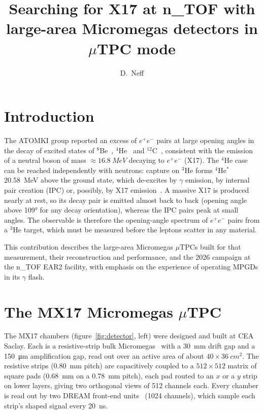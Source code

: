\documentclass[a4paper,11pt]{article}
\title{\boldmath Searching for X17 at n\_TOF with large-area Micromegas detectors in $\mu$TPC mode}
\author[a,1]{D.~Neff\note{Corresponding author.}}
\affiliation[a]{AFFILIATION,\\ADDRESS, COUNTRY} %
\begin{document}
\maketitle
\flushbottom

\section{Introduction}
\label{sec:intro}

The ATOMKI group reported an excess of $e^+e^-$ pairs at large opening angles in the decay of
excited states of $^8$Be~\cite{Krasznahorkay2016}, $^4$He~\cite{Krasznahorkay2021} and
$^{12}$C~\cite{Krasznahorkay2022}, consistent with the emission of a neutral boson of mass
$\approx\SI{16.8}{MeV}$ decaying to $e^+e^-$ (X17). The $^4$He case can be reached independently with
neutrons: capture on $^3$He forms $^4$He$^*$ \SI{20.58}{MeV} above the ground state, which
de-excites by $\gamma$ emission, by internal pair creation (IPC) or, possibly, by X17
emission~\cite{Viviani2022}. A massive X17 is produced nearly at rest, so its decay pair is emitted
almost back to back (opening angle above \ang{109} for any decay orientation), whereas the IPC
pairs peak at small angles. The observable is therefore the opening-angle spectrum of $e^+e^-$
pairs from a $^3$He target, which must be measured before the leptons scatter in any material.

This contribution describes the large-area Micromegas $\mu$TPCs built for that measurement, their
reconstruction and performance, and the 2026 campaign at the n\_TOF EAR2 facility, with emphasis on
the experience of operating MPGDs in its $\gamma$ flash.

\section{The MX17 Micromegas $\mu$TPC}
\label{sec:detector}

The MX17 chambers (figure~\ref{fig:detector}, left) were designed and built at CEA Saclay. Each is a
resistive-strip bulk Micromegas~\cite{Giomataris1996,Alexopoulos2011} with a \SI{30}{mm} drift gap
and a \SI{150}{\micro m} amplification gap, read out over an active area of about
$40\times\SI{36}{cm^2}$. The resistive strips (\SI{0.80}{mm} pitch) are capacitively coupled to a
$512\times512$ matrix of square pads (\SI{0.68}{mm} on a \SI{0.78}{mm} pitch), each pad routed to an
$x$ or a $y$ strip on lower layers, giving two orthogonal views of 512 channels each. Every chamber
is read out by two DREAM front-end units~\cite{DREAM} (1024 channels), which sample each strip's
shaped signal every \SI{20}{ns}.
\end{document}
